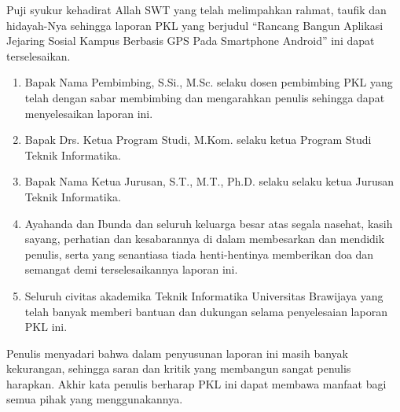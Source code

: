 \documentclass{pkl}
\begin{document}
\cover

\approvalpage

\approvalpagelapangan


\preface

Puji syukur kehadirat Allah SWT yang telah melimpahkan
rahmat, taufik dan hidayah-Nya sehingga laporan PKL yang berjudul
“Rancang Bangun Aplikasi Jejaring Sosial Kampus Berbasis GPS Pada
Smartphone Android” ini dapat terselesaikan.

\begin{enumerate}
\item{Bapak Nama Pembimbing, S.Si., M.Sc. selaku dosen pembimbing PKL
    yang telah dengan sabar membimbing dan mengarahkan penulis
    sehingga dapat menyelesaikan laporan ini.}
\item{Bapak Drs. Ketua Program Studi, M.Kom. selaku ketua Program
    Studi Teknik Informatika.}
\item{Bapak Nama Ketua Jurusan, S.T., M.T., Ph.D. selaku selaku ketua
    Jurusan Teknik Informatika.}
\item{Ayahanda dan Ibunda dan seluruh keluarga besar atas segala
    nasehat, kasih sayang, perhatian dan kesabarannya di dalam
    membesarkan dan mendidik penulis, serta yang senantiasa tiada
    henti-hentinya memberikan doa dan semangat demi terselesaikannya
    laporan ini.}
\item{Seluruh civitas akademika Teknik Informatika Universitas
    Brawijaya yang telah banyak memberi bantuan dan dukungan selama
    penyelesaian laporan PKL ini.}
\end{enumerate}

Penulis menyadari bahwa dalam penyusunan laporan ini masih banyak kekurangan,
sehingga saran dan kritik yang membangun sangat penulis harapkan. Akhir kata penulis
berharap PKL ini dapat membawa manfaat bagi semua pihak yang menggunakannya.

\vspace{1.5cm}
\end{document}
